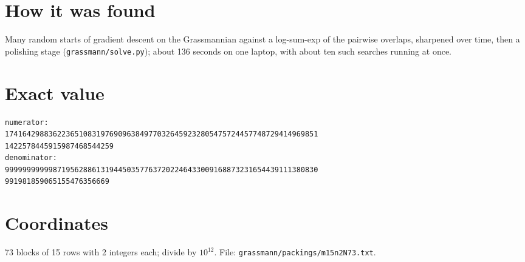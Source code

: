 \documentclass[11pt,a4paper]{article}
\begin{document}
\section{How it was found}
Many random starts of gradient descent on the Grassmannian against a log-sum-exp of the pairwise overlaps, sharpened over time, then a polishing stage (\texttt{grassmann/solve.py}); about 136 seconds on one laptop, with about ten such searches running at once.


\appendix
\section{Exact value}
{\small
\begin{verbatim}
numerator:
174164298836223651083197690963849770326459232805475724457748729414969851
1422578445915987468544259
denominator:
999999999998719562886131944503577637202246433009168873231654439111380830
991981859065155476356669
\end{verbatim}}

\section{Coordinates}
73 blocks of 15 rows with 2 integers each; divide by $10^{12}$. File: \texttt{grassmann/packings/m15n2N73.txt}.
{\tiny
\begin{multicols}{4}
\end{multicols}}
\end{document}
